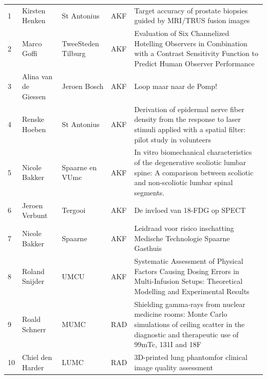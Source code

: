 \documentclass[a4paper,10pt]{report}
\begin{document}

\begin{tabular}{llllp{18cm}}
  1    & Kirsten Henken       & St Antonius           & AKF   & Target accuracy of prostate biopsies guided by MRI/TRUS fusion images                                                                                       \\
  2    & Marco Goffi          & TweeSteden Tilburg    & AKF   & Evaluation of Six Channelized Hotelling Observers in Combination with a Contrast Sensitivity Function to Predict Human Observer Performance                 \\
  3    & Alina van de Giessen & Jeroen Bosch          & AKF   & Loop maar naar de Pomp!                                                                                                                                     \\
  4    & Renske Hoeben        & St Antonius           & AKF   & Derivation of epidermal nerve fiber density from the response to laser stimuli applied with a spatial filter: pilot study in volunteers                     \\
  5    & Nicole Bakker        & Spaarne en VUmc       & AKF   & In vitro biomechanical characteristics of the degenerative scoliotic lumbar spine: A comparison between scoliotic and non-scoliotic lumbar spinal segments. \\
  6    & Jeroen Verbunt       & Tergooi               & AKF   & De invloed van 18-FDG op SPECT                                                                                                                              \\
  7    & Nicole Bakker        & Spaarne               & AKF   & Leidraad voor risico inschatting Medische Technologie Spaarne Gasthuis                                                                                      \\
  8    & Roland Snijder       & UMCU                  & AKF   & Systematic Assessment of Physical Factors Causing Dosing Errors in Multi-Infusion Setups: Theoretical Modelling and Experimental Results                    \\
  9  & Roald Schnerr       & MUMC                  & RAD   & Shielding gamma-rays from nuclear medicine rooms: Monte Carlo simulations of ceiling scatter in the diagnostic and therapeutic use of 99mTc, 131I and 18F  \\
  10 & Chiel den Harder    & LUMC                  & RAD   & 3D-printed lung phantomfor clinical image quality assessment                                                                                               \\

\end{tabular}
\end{document}
